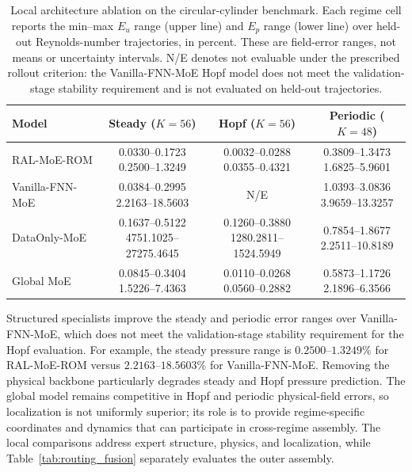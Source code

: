 \begin{table}[!ht]
\centering
\caption{Local architecture ablation on the circular-cylinder benchmark.
Each regime cell reports the min--max $E_u$ range (upper line) and $E_p$
range (lower line) over held-out Reynolds-number trajectories, in percent.
These are field-error ranges, not means or uncertainty intervals.
N/E denotes not evaluable under the prescribed rollout criterion: the
Vanilla-FNN-MoE Hopf model does not meet the validation-stage stability
requirement and is not evaluated on held-out trajectories.}
\label{tab:compact_ablation}
\small
\setlength{\tabcolsep}{4pt}
\begin{tabular}{@{}lccc@{}}
\toprule
Model & Steady ($K=56$) & Hopf ($K=56$) & Periodic ($K=48$) \\
\midrule
RAL-MoE-ROM
& \shortstack{0.0330--0.1723\\0.2500--1.3249}
& \shortstack{0.0032--0.0288\\0.0355--0.4321}
& \shortstack{0.3809--1.3473\\1.6825--5.9601} \\
\addlinespace
Vanilla-FNN-MoE
& \shortstack{0.0384--0.2995\\2.2163--18.5603}
& N/E
& \shortstack{1.0393--3.0836\\3.9659--13.3257} \\
\addlinespace
DataOnly-MoE
& \shortstack{0.1637--0.5122\\4751.1025--27275.4645}
& \shortstack{0.1260--0.3880\\1280.2811--1524.5949}
& \shortstack{0.7854--1.8677\\2.2511--10.8189} \\
\addlinespace
Global MoE
& \shortstack{0.0845--0.3404\\1.5226--7.4363}
& \shortstack{0.0110--0.0268\\0.0560--0.2882}
& \shortstack{0.5873--1.1726\\2.1896--6.3566} \\
\bottomrule
\end{tabular}
\end{table}

\FloatBarrier
Structured specialists improve the steady and periodic error ranges over
Vanilla-FNN-MoE, which does not meet the validation-stage stability requirement
for the Hopf evaluation. For example,
the steady pressure range is $0.2500$--$1.3249\%$ for RAL-MoE-ROM versus
$2.2163$--$18.5603\%$ for Vanilla-FNN-MoE. Removing the physical backbone
particularly degrades steady and Hopf pressure prediction. The global model
remains competitive in Hopf and periodic physical-field errors, so
localization is not uniformly superior; its role is to provide regime-specific
coordinates and dynamics that can participate in cross-regime assembly.
The local comparisons address expert structure, physics, and localization,
while Table~\ref{tab:routing_fusion} separately evaluates the outer assembly.

